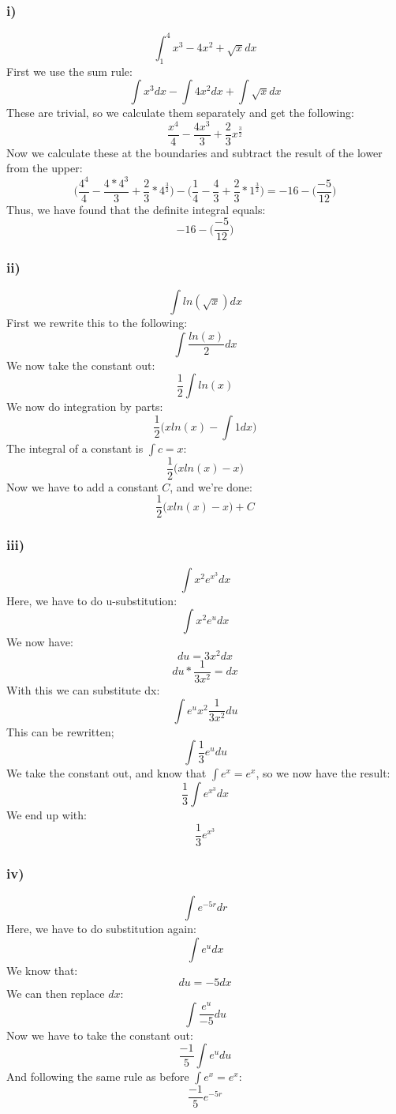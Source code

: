 \subsubsection{i)}
$$
\int_1^4 x^3-4x^2+\sqrt{x}dx
$$
First we use the sum rule:
$$
\int x^3dx-\int 4x^2dx+\int\sqrt{x}dx
$$
These are trivial, so we calculate them separately and get the following:
$$
\frac{x^4}{4}-\frac{4x^3}{3}+\frac{2}{3}x^{\frac{3}{2}}
$$
Now we calculate these at the boundaries and subtract the result of the lower from the upper:
$$
\bigg(\frac{4^4}{4}-\frac{4*4^3}{3}+\frac{2}{3}*4^\frac{3}{2}\bigg)-\bigg(\frac{1}{4}-\frac{4}{3}+\frac{2}{3}*1^\frac{3}{2}\bigg) = -16-\bigg(\frac{-5}{12}\bigg)
$$
Thus, we have found that the definite integral equals:
$$
-16-\bigg(\frac{-5}{12}\bigg)
$$
\subsubsection{ii)}
$$
\int ln(\sqrt{x})dx
$$
First we rewrite this to the following:
$$
\int \frac{ln(x)}{2}dx
$$
We now take the constant out:
$$
\frac{1}{2} \int ln(x)
$$
We now do integration by parts:
$$
\frac{1}{2}\bigg(xln(x)-\int 1dx\bigg)
$$
The integral of a constant is $\int c = x$:
$$
\frac{1}{2}\bigg(xln(x)-x\bigg)
$$
Now we have to add a constant $C$, and we're done:
$$
\frac{1}{2}\bigg(xln(x)-x\bigg)+C
$$
\subsubsection{iii)}
$$
\int x^2e^{x^3}dx
$$
Here, we have to do u-substitution:
$$
\int x^2e^udx
$$
We now have:
$$
du = 3x^2dx 
$$
$$
du*\frac{1}{3x^2} = dx
$$
With this we can substitute dx:
$$
\int e^ux^2\frac{1}{3x^2}du
$$
This can be rewritten;
$$
\int \frac{1}{3} e^udu
$$
We take the constant out, and know that $\int e^x = e^x$, so we now have the result:
$$
\frac{1}{3}\int e^{x^3}dx
$$
We end up with:
$$
\frac{1}{3}e^{x^3}
$$
\subsubsection{iv)}
$$
\int e^{-5r}dr
$$
Here, we have to do substitution again:
$$
\int e^udx
$$
We know that:
$$
du = -5dx
$$
We can then replace $dx$:
$$
\int \frac{e^u}{-5}du
$$
Now we have to take the constant out:
$$
\frac{-1}{5}\int e^udu
$$
And following the same rule as before $\int e^x = e^x$:
$$
\frac{-1}{5}e^{-5r}
$$